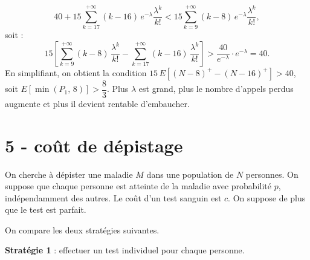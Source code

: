 \begin{enumerate}
{\begin{solution}
            \[
                40 + 15\sum_{k=17}^{+\infty}(k-16)\,e^{-\lambda}\frac{\lambda^k}{k!} < 15\sum_{k=9}^{+\infty}(k-8)\,e^{-\lambda}\frac{\lambda^k}{k!},
            \]
            soit :
            \[
                15\left[\sum_{k=9}^{+\infty}(k-8)\,\frac{\lambda^k}{k!} - \sum_{k=17}^{+\infty}(k-16)\,\frac{\lambda^k}{k!}\right] > \frac{40}{e^{-\lambda}}\cdot e^{-\lambda} = 40.
            \]
            En simplifiant, on obtient la condition $15\,E\!\left[(N-8)^+ - (N-16)^+\right] > 40$, soit $E\!\left[\min(P_1,\, 8)\right] > \dfrac{8}{3}$. Plus $\lambda$ est grand, plus le nombre d'appels perdus augmente et plus il devient rentable d'embaucher.
        \end{solution}
    }{}
\end{enumerate}
\vspace{1em}

\section*{5 - coût de dépistage}
On cherche à dépister une maladie $M$ dans une population de $N$ personnes. On suppose que chaque personne est atteinte de la maladie avec probabilité $p$, indépendamment des autres. Le coût d'un test sanguin est $c$. On suppose de plus que le test est parfait.

On compare les deux stratégies suivantes.

\textbf{Stratégie 1} : effectuer un test individuel pour chaque personne.


